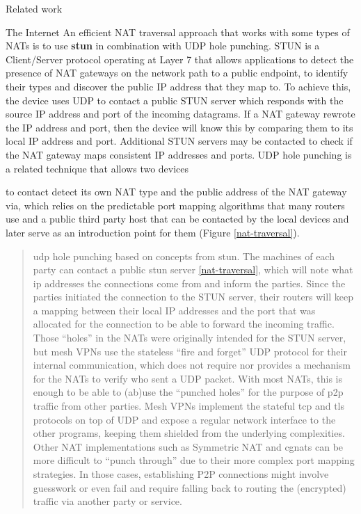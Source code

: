 \begin{frame}[fragile]{Related work}
\begin{block}{The Internet}
An efficient NAT traversal approach that works with some types of NATs
is to use \textbf{\gls{stun}} \autocite{stunRFC} in combination with UDP
hole punching. STUN is a Client/Server protocol operating at Layer 7
that allows applications to detect the presence of NAT gateways on the
network path to a public endpoint, to identify their types and discover
the public IP address that they map to. To achieve this, the device uses
UDP to contact a public STUN server which responds with the source IP
address and port of the incoming datagrams. If a NAT gateway rewrote the
IP address and port, then the device will know this by comparing them to
its local IP address and port. Additional STUN servers may be contacted
to check if the NAT gateway maps consistent IP addresses and ports. UDP
hole punching is a related technique that allows two devices

to contact detect its own NAT type and the public address of the NAT
gateway via, which relies on the predictable port mapping algorithms
that many routers use and a public third party host that can be
contacted by the local devices and later serve as an introduction point
for them (Figure \ref{nat-traversal}).


\begin{quote}
\gls{udp} hole punching based on concepts from \gls{stun}. The machines
of each party can contact a public \gls{stun} server
\ref{nat-traversal}, which will note what \gls{ip} addresses the
connections come from and inform the parties. Since the parties
initiated the connection to the STUN server, their routers will keep a
mapping between their local IP addresses and the port that was allocated
for the connection to be able to forward the incoming traffic. Those
``holes'' in the NATs were originally intended for the STUN server, but
mesh VPNs use the stateless ``fire and forget'' UDP protocol for their
internal communication, which does not require nor provides a mechanism
for the NATs to verify who sent a UDP packet. With most NATs, this is
enough to be able to (ab)use the ``punched holes'' for the purpose of
\gls{p2p} traffic from other parties. Mesh VPNs implement the stateful
\gls{tcp} and \gls{tls} protocols on top of UDP and expose a regular
network interface to the other programs, keeping them shielded from the
underlying complexities. Other NAT implementations such as Symmetric NAT
and \glspl{cgnat} can be more difficult to ``punch through'' due to
their more complex port mapping strategies. In those cases, establishing
P2P connections might involve guesswork or even fail and require falling
back to routing the (encrypted) traffic via another party or service.
\end{quote}


\end{block}
\end{frame}
